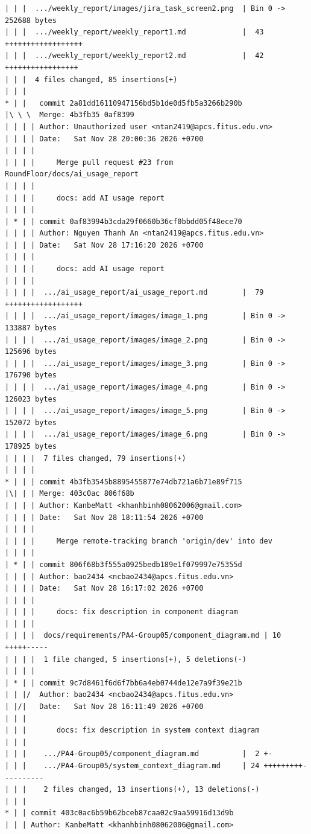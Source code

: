 \documentclass[12pt]{article}
\begin{document}
\begin{lstlisting}[numbers=none,breaklines=true]
| | |  .../weekly_report/images/jira_task_screen2.png  | Bin 0 -> 252688 bytes
| | |  .../weekly_report/weekly_report1.md             |  43 ++++++++++++++++++
| | |  .../weekly_report/weekly_report2.md             |  42 +++++++++++++++++
| | |  4 files changed, 85 insertions(+)
| | |
* | |   commit 2a81dd16110947156bd5b1de0d5fb5a3266b290b
|\ \ \  Merge: 4b3fb35 0af8399
| | | | Author: Unauthorized user <ntan2419@apcs.fitus.edu.vn>
| | | | Date:   Sat Nov 28 20:00:36 2026 +0700
| | | |
| | | |     Merge pull request #23 from RoundFloor/docs/ai_usage_report
| | | |
| | | |     docs: add AI usage report
| | | |
| * | | commit 0af83994b3cda29f0660b36cf0bbdd05f48ece70
| | | | Author: Nguyen Thanh An <ntan2419@apcs.fitus.edu.vn>
| | | | Date:   Sat Nov 28 17:16:20 2026 +0700
| | | |
| | | |     docs: add AI usage report
| | | |
| | | |  .../ai_usage_report/ai_usage_report.md        |  79 ++++++++++++++++++
| | | |  .../ai_usage_report/images/image_1.png        | Bin 0 -> 133887 bytes
| | | |  .../ai_usage_report/images/image_2.png        | Bin 0 -> 125696 bytes
| | | |  .../ai_usage_report/images/image_3.png        | Bin 0 -> 176790 bytes
| | | |  .../ai_usage_report/images/image_4.png        | Bin 0 -> 126023 bytes
| | | |  .../ai_usage_report/images/image_5.png        | Bin 0 -> 152072 bytes
| | | |  .../ai_usage_report/images/image_6.png        | Bin 0 -> 178925 bytes
| | | |  7 files changed, 79 insertions(+)
| | | |
* | | | commit 4b3fb3545b8895455877e74db721a6b71e89f715
|\| | | Merge: 403c0ac 806f68b
| | | | Author: KanbeMatt <khanhbinh08062006@gmail.com>
| | | | Date:   Sat Nov 28 18:11:54 2026 +0700
| | | |
| | | |     Merge remote-tracking branch 'origin/dev' into dev
| | | |
| * | | commit 806f68b3f555a0925bedb189e1f079997e75355d
| | | | Author: bao2434 <ncbao2434@apcs.fitus.edu.vn>
| | | | Date:   Sat Nov 28 16:17:02 2026 +0700
| | | |
| | | |     docs: fix description in component diagram
| | | |
| | | |  docs/requirements/PA4-Group05/component_diagram.md | 10 +++++-----
| | | |  1 file changed, 5 insertions(+), 5 deletions(-)
| | | |
| * | | commit 9c7d8461f6d6f7bb6a4eb0744de12e7a9f39e21b
| | |/  Author: bao2434 <ncbao2434@apcs.fitus.edu.vn>
| |/|   Date:   Sat Nov 28 16:11:49 2026 +0700
| | |
| | |       docs: fix description in system context diagram
| | |
| | |    .../PA4-Group05/component_diagram.md          |  2 +-
| | |    .../PA4-Group05/system_context_diagram.md     | 24 +++++++++----------
| | |    2 files changed, 13 insertions(+), 13 deletions(-)
| | |
* | | commit 403c0ac6b59b62bceb87caa02c9aa59916d13d9b
| | | Author: KanbeMatt <khanhbinh08062006@gmail.com>

\end{lstlisting}
\end{document}
